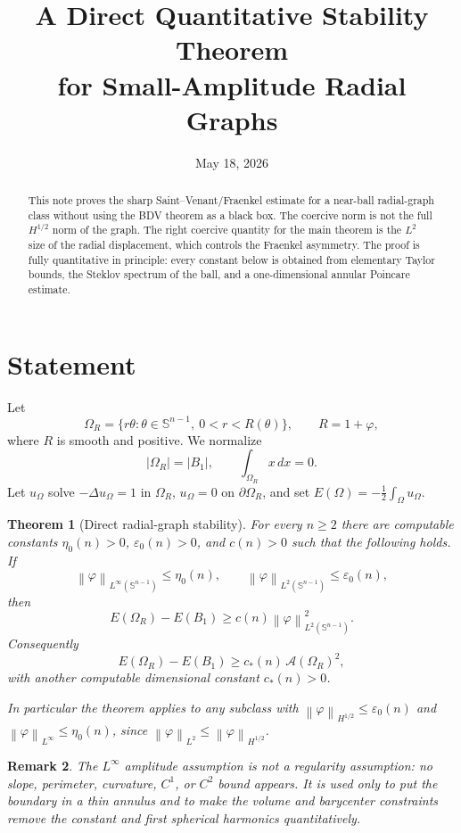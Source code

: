 \documentclass[11pt]{article}
\title{A Direct Quantitative Stability Theorem\\
for Small-Amplitude Radial Graphs}
\author{}
\date{May 18, 2026}
\newtheorem{theorem}{Theorem}[section]
\newtheorem{remark}[theorem]{Remark}
\newcommand{\Sph}{\mathbb S^{n-1}}
\newcommand{\Om}{\Omega}
\newcommand{\eps}{\varepsilon}
\newcommand{\cA}{\mathcal A}
\newcommand{\norm}[1]{\left\|#1\right\|}
\begin{document}
\maketitle

\begin{abstract}
This note proves the sharp Saint--Venant/Fraenkel estimate for a
near-ball radial-graph class without using the BDV theorem as a black box.
The coercive norm is not the full \(H^{1/2}\) norm of the graph.  The
right coercive quantity for the main theorem is the \(L^2\) size of the
radial displacement, which controls the Fraenkel asymmetry.  The proof is
fully quantitative in principle: every constant below is obtained from
elementary Taylor bounds, the Steklov spectrum of the ball, and a
one-dimensional annular Poincare estimate.
\end{abstract}

\section{Statement}

Let
\[
   \Om_R=\{r\theta: \theta\in\Sph,\ 0<r<R(\theta)\},\qquad
   R=1+\varphi,
\]
where \(R\) is smooth and positive.  We normalize
\[
   |\Om_R|=|B_1|,\qquad \int_{\Om_R}x\,dx=0.
\]
Let \(u_\Om\) solve \(-\Delta u_\Om=1\) in \(\Om_R\), \(u_\Om=0\) on
\(\partial\Om_R\), and set \(E(\Om)=-\frac12\int_\Om u_\Om\).

\begin{theorem}[Direct radial-graph stability]\label{thm:direct}
For every \(n\ge2\) there are computable constants
\(\eta_0(n)>0\), \(\eps_0(n)>0\), and \(c(n)>0\) such that the following
holds.  If
\[
   \norm{\varphi}_{L^\infty(\Sph)}\le\eta_0(n),\qquad
   \norm{\varphi}_{L^2(\Sph)}\le\eps_0(n),
\]
then
\[
   E(\Om_R)-E(B_1)\ge c(n)\norm{\varphi}_{L^2(\Sph)}^2.
\]
Consequently
\[
   E(\Om_R)-E(B_1)\ge c_*(n)\,\cA(\Om_R)^2,
\]
with another computable dimensional constant \(c_*(n)>0\).

In particular the theorem applies to any subclass with
\(\norm{\varphi}_{H^{1/2}}\le\eps_0(n)\) and
\(\norm{\varphi}_{L^\infty}\le\eta_0(n)\), since
\(\norm{\varphi}_{L^2}\le\norm{\varphi}_{H^{1/2}}\).
\end{theorem}

\begin{remark}
The \(L^\infty\) amplitude assumption is not a regularity assumption: no
slope, perimeter, curvature, \(C^1\), or \(C^2\) bound appears.  It is used
only to put the boundary in a thin annulus and to make the volume and
barycenter constraints remove the constant and first spherical harmonics
quantitatively.
\end{remark}
\end{document}
